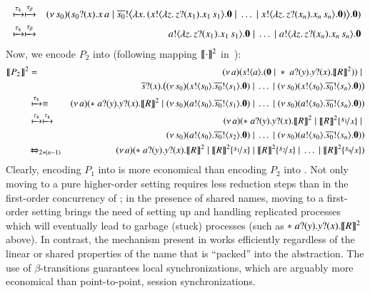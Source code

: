 \documentclass[preprint,11pt]{elsarticle}
\begin{document}
{\begin{eqnarray*}
	& \xmapsto{\tau_{\mathsf{s}}} \xmapsto{\tau_{\beta}} & 
	(\nu\, s_0)(s_0 ? (x) . x\, {a} \;|\; \overline{s_0} ! \big\langle \lambda x.\,(x ! \langle \lambda z.\,z ? (x_1) . x_1\, {s_1} \rangle . \mathbf{0} \;|\; \dots \;|\; x ! \langle \lambda z.\,z ? (x_n) . x_n\, {s_n} \rangle . \mathbf{0}) \big\rangle . \mathbf{0})\\
	& \xmapsto{\tau_{\mathsf{s}}}\xmapsto{\tau_{\beta}}  & 
	a ! \langle \lambda z.\,z ? (x_1) . x_1\, {s_1} \rangle . \mathbf{0} \;|\; \dots \;|\; a ! \langle \lambda z.\,z ? (x_n) . x_n\, {s_n} \rangle . \mathbf{0}
\end{eqnarray*}
Now, we encode $P_2$ into \sessp (following mapping $\llbracket\cdot\rrbracket^2$ in~):
\begin{eqnarray*}
\pmap{P_2}{2} & = & 	\newsp{a}{\bout{s}{a} (\inact \Par \repl{\binp{a}{y} \binp{y}{x} \pmap{R}{2}})} \Par \\
& & \quad \binp{\dual{s}}{x} \big(\newsp{s_0}{\bout{x}{s_0} \bout{\dual{s_0}}{s_1} \inact} \Par \dots \Par \newsp{s_0}{\bout{x}{s_0} \bout{\dual{s_0}}{s_n}\inact}\big)
	\\
	& \hby{\stau} \equiv & 
	\newsp{a}{\repl{\binp{a}{y} \binp{y}{x} \pmap{R}{2}} \Par \newsp{s_0}{\bout{a}{s_0} \bout{\dual{s_0}}{s_1} \inact} \Par \dots \Par \newsp{s_0}{\bout{a}{s_0} \bout{\dual{s_0}}{s_n} \inact}}
	\\
	& \hby{\stau}  \hby{\stau}   & 
	\newsp{a}{\repl{\binp{a}{y} \binp{y}{x} \pmap{R}{2}} \Par \pmap{R}{2}\subst{s_1}{x} \Par 
	\\
	&  & \qquad \qquad \newsp{s_0}{\bout{a}{s_0} \bout{\dual{s_0}}{s_2} \inact} \Par \dots \Par \newsp{s_0}{\bout{a}{s_0} \bout{\dual{s_0}}{s_n} \inact}}
	\\
	& \Hby{}_{2*(n - 1)} & 
	\newsp{a}{\repl{\binp{a}{y} \binp{y}{x} \pmap{R}{2}} \Par \pmap{R}{2}\subst{s_1}{x} \Par \pmap{R}{2}\subst{s_2}{x} \Par \dots \Par \pmap{R}{2}\subst{s_n}{x}}
\end{eqnarray*}
Clearly, encoding $P_1$ into \HO is more economical than 
encoding $P_2$ into \sessp. Not only moving to a pure higher-order setting requires less reduction steps than in the first-order concurrency of \sessp; in the presence of shared names, moving to a first-order setting brings the need of setting up and handling replicated processes which will eventually lead to garbage (stuck) processes (such as $\ast\;a ? (y) . y ? (x) . \llbracket R\rrbracket^2$ above). In contrast, the mechanism present in \HO works efficiently regardless of the linear or shared properties of the name that is ``packed'' into the abstraction. 
The use of $\beta$-transitions guarantees local synchronizations, which are arguably more economical than point-to-point, session synchronizations.

}
\end{document}
